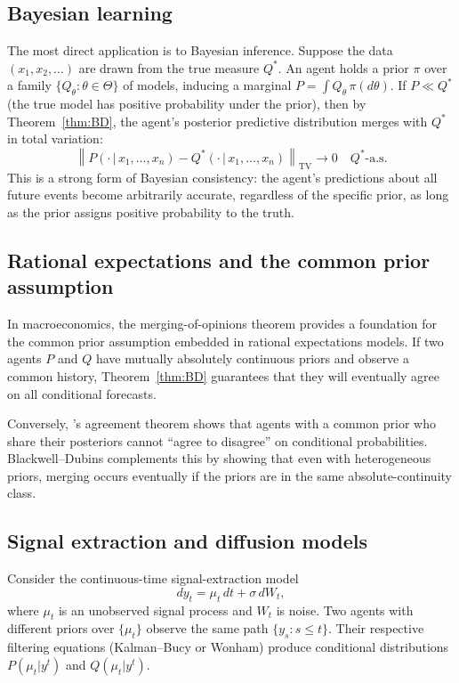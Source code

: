 \documentclass[12pt]{article}
\newcommand{\TV}[1]{\left\|#1\right\|_{\mathrm{TV}}}
\begin{document}
\subsection{Bayesian learning}

The most direct application is to Bayesian inference.  Suppose the data
$(x_1, x_2, \ldots)$ are drawn from the true measure $Q^*$.  An agent holds
a prior $\pi$ over a family $\{Q_\theta : \theta \in \Theta\}$ of models,
inducing a marginal $P = \int Q_\theta\, \pi(d\theta)$.  If $P \ll Q^*$ (the
true model has positive probability under the prior), then by
Theorem~\ref{thm:BD}, the agent's posterior predictive distribution merges
with $Q^*$ in total variation:
\[
\TV{P(\cdot\,|\,x_1, \ldots, x_n) - Q^*(\cdot\,|\,x_1, \ldots, x_n)} \to 0
\quad Q^*\text{-a.s.}
\]
This is a strong form of Bayesian consistency: the agent's predictions about
all future events become arbitrarily accurate, regardless of the specific
prior, as long as the prior assigns positive probability to the truth.

\subsection{Rational expectations and the common prior assumption}

In macroeconomics, the merging-of-opinions theorem provides a foundation for
the common prior assumption embedded in rational expectations models.  If two
agents $P$ and $Q$ have mutually absolutely continuous priors and observe a
common history, Theorem~\ref{thm:BD} guarantees that they will eventually
agree on all conditional forecasts.

Conversely, \citet{aumann1976}'s agreement theorem shows that agents with
a common prior who share their posteriors cannot ``agree to disagree'' on
conditional probabilities.  Blackwell--Dubins complements this by showing
that even with heterogeneous priors, merging occurs eventually if the priors
are in the same absolute-continuity class.

\subsection{Signal extraction and diffusion models}

Consider the continuous-time signal-extraction model
\[
dy_t = \mu_t\, dt + \sigma\, dW_t,
\]
where $\mu_t$ is an unobserved signal process and $W_t$ is noise.  Two
agents with different priors over $\{\mu_t\}$ observe the same path
$\{y_s : s \leq t\}$.  Their respective filtering equations
(Kalman--Bucy or Wonham) produce conditional distributions $P(\mu_t|y^t)$
and $Q(\mu_t|y^t)$.
\end{document}
